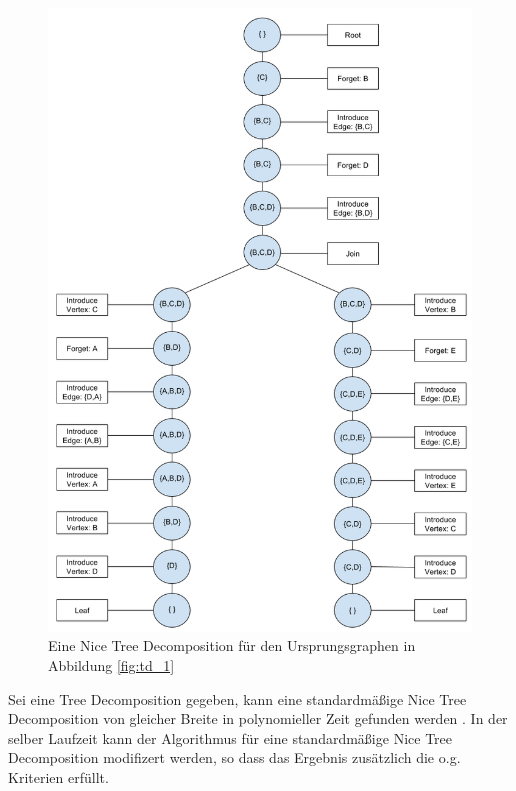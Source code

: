 \begin{definition}
\begin{figure}
  \centering
    \includegraphics[width=1.0\textwidth]{./imgs/TD_3.png}
  	\caption{Eine Nice Tree Decomposition für den Ursprungsgraphen in Abbildung \ref{fig:td_1}}
\end{figure}

Sei eine Tree Decomposition gegeben, kann eine standardmäßige Nice Tree Decomposition von gleicher Breite in polynomieller Zeit gefunden werden \cite{kloks1994}. In der selber Laufzeit kann der Algorithmus für eine standardmäßige Nice Tree Decomposition modifizert werden, so dass das Ergebnis zusätzlich die o.g. Kriterien erfüllt.
\end{definition}

